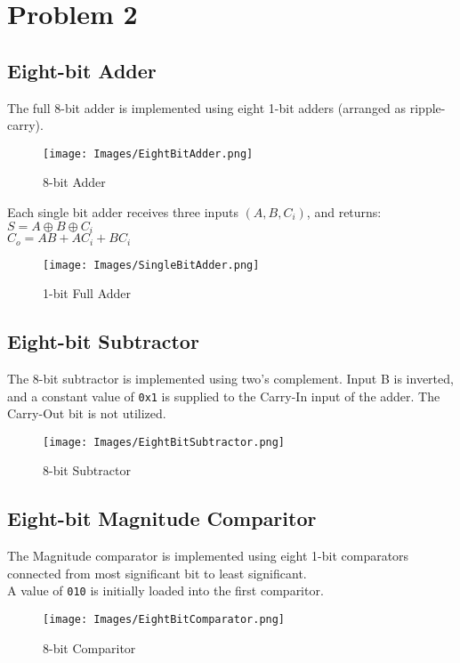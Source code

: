 \clearpage
\section*{Problem 2}
\subsection*{Eight-bit Adder}
\noindent
The full 8-bit adder is implemented using eight 1-bit adders (arranged as ripple-carry).\\
\begin{figure}[!ht]
    \centering
    \texttt{[image: Images/EightBitAdder.png]}
    \caption{8-bit Adder}
\end{figure}

\clearpage
\noindent
Each single bit adder receives three inputs $(A,B,C_i)$, and returns:\\
$S=A\oplus B\oplus C_i$\\
$C_o=AB+AC_i+BC_i$
\begin{figure}[!ht]
    \centering
    \texttt{[image: Images/SingleBitAdder.png]}
    \caption{1-bit Full Adder}
\end{figure}

\subsection*{Eight-bit Subtractor}
\noindent
The 8-bit subtractor is implemented using two's complement. Input B is inverted, and a constant value of \verb+0x1+ is supplied to the Carry-In input of the adder. The Carry-Out bit is not utilized.
\begin{figure}[!ht]
    \centering
    \texttt{[image: Images/EightBitSubtractor.png]}
    \caption{8-bit Subtractor}
\end{figure}

\clearpage
\subsection*{Eight-bit Magnitude Comparitor}
\noindent
The Magnitude comparator is implemented using eight 1-bit comparators connected from most significant bit to least significant.\\
A value of \verb+010+ is initially loaded into the first comparitor.
\begin{figure}[!ht]
    \centering
    \texttt{[image: Images/EightBitComparator.png]}
    \caption{8-bit Comparitor}
\end{figure}

